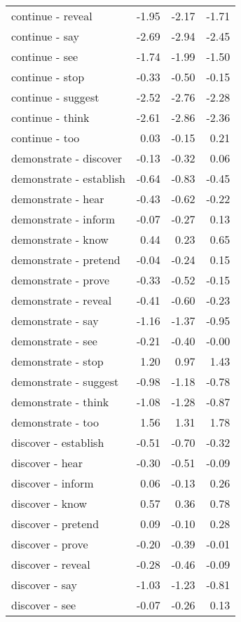 \begin{longtable}{lrrr}
  continue - reveal & -1.95 & -2.17 & -1.71 \\ 
  continue - say & -2.69 & -2.94 & -2.45 \\ 
  continue - see & -1.74 & -1.99 & -1.50 \\ 
  continue - stop & -0.33 & -0.50 & -0.15 \\ 
  continue - suggest & -2.52 & -2.76 & -2.28 \\ 
  continue - think & -2.61 & -2.86 & -2.36 \\ 
  continue - too & 0.03 & -0.15 & 0.21 \\ 
  demonstrate - discover & -0.13 & -0.32 & 0.06 \\ 
  demonstrate - establish & -0.64 & -0.83 & -0.45 \\ 
  demonstrate - hear & -0.43 & -0.62 & -0.22 \\ 
  demonstrate - inform & -0.07 & -0.27 & 0.13 \\ 
  demonstrate - know & 0.44 & 0.23 & 0.65 \\ 
  demonstrate - pretend & -0.04 & -0.24 & 0.15 \\ 
  demonstrate - prove & -0.33 & -0.52 & -0.15 \\ 
  demonstrate - reveal & -0.41 & -0.60 & -0.23 \\ 
  demonstrate - say & -1.16 & -1.37 & -0.95 \\ 
  demonstrate - see & -0.21 & -0.40 & -0.00 \\ 
  demonstrate - stop & 1.20 & 0.97 & 1.43 \\ 
  demonstrate - suggest & -0.98 & -1.18 & -0.78 \\ 
  demonstrate - think & -1.08 & -1.28 & -0.87 \\ 
  demonstrate - too & 1.56 & 1.31 & 1.78 \\ 
  discover - establish & -0.51 & -0.70 & -0.32 \\ 
  discover - hear & -0.30 & -0.51 & -0.09 \\ 
  discover - inform & 0.06 & -0.13 & 0.26 \\ 
  discover - know & 0.57 & 0.36 & 0.78 \\ 
  discover - pretend & 0.09 & -0.10 & 0.28 \\ 
  discover - prove & -0.20 & -0.39 & -0.01 \\ 
  discover - reveal & -0.28 & -0.46 & -0.09 \\ 
  discover - say & -1.03 & -1.23 & -0.81 \\ 
  discover - see & -0.07 & -0.26 & 0.13 \\ 

\end{longtable}
